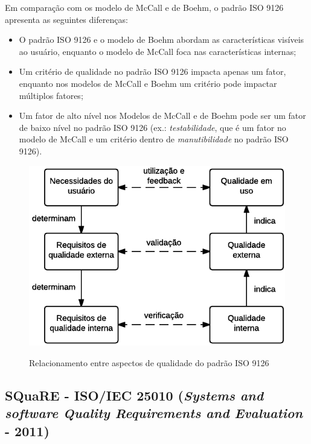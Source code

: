 \documentclass[
	12pt,				%
	openright,			%
	oneside,			%
	a4paper,			%
	english,			%
	brazil,				%
	]{abntex2}
\begin{document}
Em comparação com os modelo de McCall e de Boehm, o padrão ISO 9126 apresenta as seguintes diferenças:
\begin{itemize}
    \item O padrão ISO 9126 e o modelo de Boehm abordam as características visíveis ao usuário, enquanto o modelo de McCall foca nas características internas;
    \item Um critério de qualidade no padrão ISO 9126 impacta apenas um fator, enquanto nos modelos de McCall e Boehm um critério pode impactar múltiplos fatores;
    \item Um fator de alto nível nos Modelos de McCall e de Boehm pode ser um fator de baixo nível no padrão ISO 9126 (ex.: \emph{testabilidade}, que é um fator no modelo de McCall e um critério dentro de \emph{manutibilidade} no padrão ISO 9126).
\end{itemize}

\begin{figure}[h]
    \centering
    \caption{Relacionamento entre aspectos de qualidade do padrão ISO 9126}
    \graphicspath{ {./graphics/} }
    \includegraphics[scale=1.0]{iso9126-hierarquia_relacionamento-andrei}
    \label{fig:iso9126-hierarquia_relacionamento}
\end{figure}

\subsection{SQuaRE - ISO/IEC 25010 (\emph{Systems and software Quality Requirements
and Evaluation} - 2011)}
\end{document}
